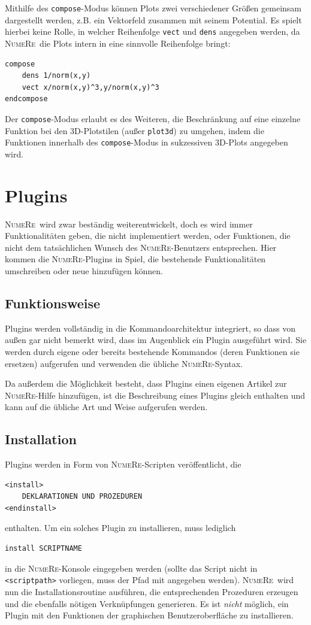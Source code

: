 \documentclass[DIV=14,headsepline,footsepline]{scrbook}
\newcommand{\NR}{\textsc{Nu\-me\-Re}}
\begin{document}
			Mithilfe des \verb+compose+-Modus können Plots zwei verschiedener Größen gemeinsam dargestellt werden, z.B. ein Vektorfeld zusammen mit seinem Potential. Es spielt hierbei keine Rolle, in welcher Reihenfolge \verb+vect+ und \verb+dens+ angegeben werden, da \NR\ die Plots intern in eine sinnvolle Reihenfolge bringt:
			\begin{lstlisting}
compose
	dens 1/norm(x,y)
	vect x/norm(x,y)^3,y/norm(x,y)^3
endcompose
			\end{lstlisting}
			
			Der \verb+compose+-Modus erlaubt es des Weiteren, die Beschränkung auf eine einzelne Funktion bei den 3D-Plotstilen (außer \verb+plot3d+) zu umgehen, indem die Funktionen innerhalb des \verb+compose+-Modus in sukzessiven 3D-Plots angegeben wird.
		\chapter{Plugins}
			\NR\ wird zwar beständig weiterentwickelt, doch es wird immer Funktionalitäten geben, die nicht implementiert werden, oder Funktionen, die nicht dem tatsächlichen Wunsch des \NR-Benutzers entsprechen. Hier kommen die \NR-Plugins in Spiel, die bestehende Funktionalitäten umschreiben oder neue hinzufügen können.
			\section{Funktionsweise}
				Plugins werden vollständig in die Kommandoarchitektur integriert, so dass von außen gar nicht bemerkt wird, dass im Augenblick ein Plugin ausgeführt wird. Sie werden durch eigene oder bereits bestehende Kommandos (deren Funktionen sie ersetzen) aufgerufen und verwenden die übliche \NR-Syntax.
				
				Da außerdem die Möglichkeit besteht, dass Plugins einen eigenen Artikel zur \NR-Hilfe hinzufügen, ist die Beschreibung eines Plugins gleich enthalten und kann auf die übliche Art und Weise aufgerufen werden.
			\section{Installation}
				Plugins werden in Form von \NR-Scripten veröffentlicht, die
				\begin{lstlisting}
<install>
	DEKLARATIONEN UND PROZEDUREN
<endinstall>
				\end{lstlisting}
				enthalten. Um ein solches Plugin zu installieren, muss lediglich
				\begin{lstlisting}
install SCRIPTNAME
				\end{lstlisting}
				in die \NR-Konsole eingegeben werden (sollte das Script nicht in \verb+<scriptpath>+ vorliegen, muss der Pfad mit angegeben werden). \NR\ wird nun die Installationsroutine ausführen, die entsprechenden Prozeduren erzeugen und die ebenfalls nötigen Verknüpfungen generieren. Es ist \emph{nicht} möglich, ein Plugin mit den Funktionen der graphischen Benutzeroberfläche zu installieren.
				
\end{document}
